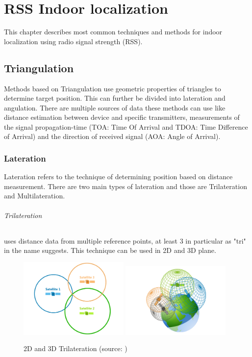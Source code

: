 \chapter{RSS Indoor localization}\label{sec:RSSIndoorLocalization}
This chapter describes most common techniques and methods for indoor localization using radio signal strength (RSS).

\section{Triangulation}\label{sec:Triangulation}
Methods based on Triangulation use geometric properties of triangles to determine target position. This can further be divided into lateration and angulation. \cite{RAinWILTaS} There are multiple sources of data these methods can use like distance estimation between device and specific transmitters, measurements of the signal propagation-time (TOA: Time Of Arrival and TDOA: Time Difference of Arrival\cite{LTinWSN}) and the direction of received
signal (AOA: Angle of Arrival\cite{AoALforWSN}).

\subsection{Lateration}\label{sec:Lateration}
Lateration refers to the technique of determining position based on distance measurement. There are two main types of lateration and those are Trilateration and Multilateration. 

\subparagraph{Trilateration} uses distance data from multiple reference points, at least 3 in particular as "tri" in the name suggests.\cite{RAinWILTaS} This technique can be used in 2D and 3D plane. 

\begin{figure}[h!]
	\begin{centering}
		\includegraphics[width=0.48\textwidth]{img/trilateration_2d}
		\includegraphics[width=0.48\textwidth]{img/trilateration_3d}
		\par\end{centering}
	\caption{2D and 3D Trilateration (source: \cite{TvTHGPSRW})\label{fig:2d_and_3d_trilateration}}
	\label{fig2}
\end{figure}

